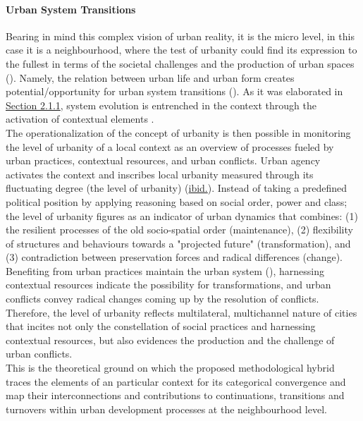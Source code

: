 \documentclass[11pt]{report}
\begin{document}
\paragraph{Urban System Transitions}

Bearing in mind this complex vision of urban reality, it is the micro level, in this case it is a neighbourhood, where the test of urbanity could find its expression to the fullest in terms of the societal challenges and the production of urban spaces (\href{Blotevogel}{\citealt{blotevogel_new_2008}}).
Namely, the relation between urban life and urban form creates potential/opportunity for urban system transitions (\href{Marcus}{\citealt{marcus_spatial_2007}}).
As it was elaborated in \href{Section 2.1.1}{Section 2.1.1}, system evolution is entrenched in the context through the activation of contextual elements .
\\

The operationalization of the concept of urbanity is then possible in monitoring the level of urbanity of a local context as an overview of processes fueled by urban practices, contextual resources, and urban conflicts.
Urban agency activates the context and inscribes local urbanity measured through its fluctuating degree (the level of urbanity) (\href{Marcus}{ibid.}).
Instead of taking a predefined political position by applying reasoning based on social order, power and class; the level of urbanity figures as an indicator of urban dynamics that combines:
(1) the resilient processes of the old socio-spatial order (maintenance),
(2) flexibility of structures and behaviours towards a "projected future" (transformation), and
(3) contradiction between preservation forces and radical differences (change).
Benefiting from urban practices maintain the urban system (\href{Taradin}{\citealt{tardin_landscape_2014}}), harnessing contextual resources indicate the possibility for transformations, and urban conflicts convey radical changes coming up by the resolution of conflicts.
Therefore, the level of urbanity reflects multilateral, multichannel  nature of cities that incites not only the constellation of social practices and harnessing contextual resources, but also evidences the production and the challenge of urban conflicts.
\\

This is the theoretical ground on which the proposed methodological hybrid traces the elements of an particular context for its categorical convergence and map their interconnections and contributions to continuations, transitions and turnovers within urban development processes at the neighbourhood level. 
\end{document}
